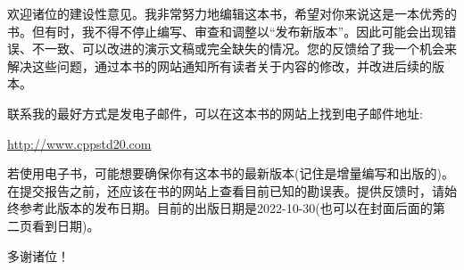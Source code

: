 
欢迎诸位的建设性意见。我非常努力地编辑这本书，希望对你来说这是一本优秀的书。但有时，我不得不停止编写、审查和调整以“发布新版本”。因此可能会出现错误、不一致、可以改进的演示文稿或完全缺失的情况。您的反馈给了我一个机会来解决这些问题，通过本书的网站通知所有读者关于内容的修改，并改进后续的版本。

联系我的最好方式是发电子邮件，可以在这本书的网站上找到电子邮件地址:

\url{http://www.cppstd20.com}

若使用电子书，可能想要确保你有这本书的最新版本(记住是增量编写和出版的)。在提交报告之前，还应该在书的网站上查看目前已知的勘误表。提供反馈时，请始终参考此版本的发布日期。目前的出版日期是2022-10-30(也可以在封面后面的第二页看到日期)。

多谢诸位！






